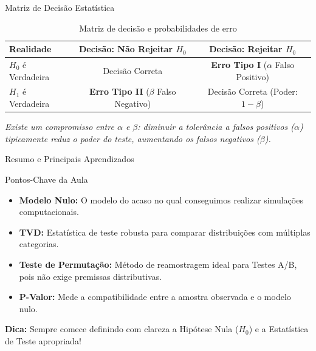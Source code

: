 \begin{frame}{Matriz de Decisão Estatística}
    \begin{table}
        \centering
        \footnotesize
        \begin{tabular}{lcc}
            \toprule
            \textbf{Realidade} & \textbf{Decisão: Não Rejeitar $H_0$} & \textbf{Decisão: Rejeitar $H_0$} \\
            \midrule
            $H_0$ é Verdadeira & Decisão Correta & \textbf{Erro Tipo I} ($\alpha$ Falso Positivo) \\ \addlinespace
            $H_1$ é Verdadeira & \textbf{Erro Tipo II} ($\beta$ Falso Negativo) & Decisão Correta (Poder: $1-\beta$) \\
            \bottomrule
        \end{tabular}
        \caption{Matriz de decisão e probabilidades de erro}
    \end{table}
    \centering
    \textit{Existe um compromisso entre $\alpha$ e $\beta$: diminuir a tolerância a falsos positivos ($\alpha$) tipicamente reduz o poder do teste, aumentando os falsos negativos ($\beta$).}
\end{frame}

\begin{frame}{Resumo e Principais Aprendizados}
    \begin{block}{Pontos-Chave da Aula}
        \begin{itemize}
            \item \textbf{Modelo Nulo:} O modelo do acaso no qual conseguimos realizar simulações computacionais.
            \item \textbf{TVD:} Estatística de teste robusta para comparar distribuições com múltiplas categorias.
            \item \textbf{Teste de Permutação:} Método de reamostragem ideal para Testes A/B, pois não exige premissas distributivas.
            \item \textbf{P-Valor:} Mede a compatibilidade entre a amostra observada e o modelo nulo.
        \end{itemize}
    \end{block}
    \centering
    \textbf{Dica:} Sempre comece definindo com clareza a Hipótese Nula ($H_0$) e a Estatística de Teste apropriada!
\end{frame}

